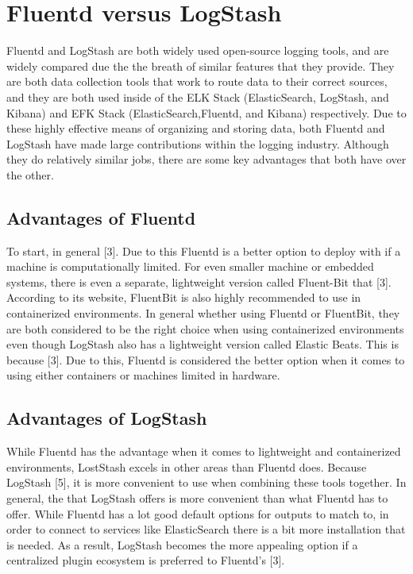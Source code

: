 \section{Fluentd versus LogStash} \label{sec:comp}
\quad \quad
 Fluentd and LogStash are both widely used open-source logging tools, and are widely compared due the the breath of similar features that 
they provide. They are both data collection tools that work to route data to their correct sources, and they are both used inside of the 
ELK Stack (ElasticSearch, LogStash, and Kibana) and EFK Stack (ElasticSearch,Fluentd, and Kibana) respectively. Due to these highly effective means of organizing and storing data, both 
Fluentd and LogStash have made large contributions within the logging industry. Although they do relatively similar jobs, there are some key advantages that both have over the other.
\subsection{Advantages of Fluentd}
\quad \quad
To start, in general [3]. Due to this Fluentd is a better option to deploy with if a machine is
computationally limited. For even smaller machine or embedded systems, there is even a separate, lightweight version called Fluent-Bit that [3]. According to its website,
FluentBit is also highly recommended to use in containerized environments. In general whether using Fluentd or FluentBit, they are both considered to be the right choice when using containerized environments even 
though LogStash also has a lightweight version called Elastic Beats. This is because [3].
Due to this, Fluentd is considered the better option when it comes to using either containers or machines limited in hardware.
\subsection{Advantages of LogStash}
\quad \quad
While Fluentd has the advantage when it comes to lightweight and containerized environments, LostStash excels in other areas than Fluentd does. Because LogStash [5], it 
is more convenient to use when combining these tools together. In general, the  that LogStash offers is more convenient than what Fluentd has to offer. While Fluentd has a lot good
default options for outputs to match to, in order to connect to services like ElasticSearch there is a bit more installation that is needed. As a result, LogStash becomes the more appealing option if a centralized plugin ecosystem is preferred to 
Fluentd's [3].
